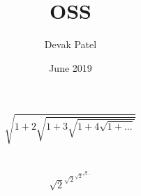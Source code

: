\documentclass{article}
\title{OSS}
\author{Devak Patel}
\date{June 2019}
\begin{document}
\maketitle
$$\sqrt{1+2\sqrt{1+3\sqrt{1+4\sqrt{1+...}}}} $$\\\\
$$\sqrt{2}^{\sqrt{2}^{\sqrt{2}^{\sqrt{2}...}}}$$
\end{document}
